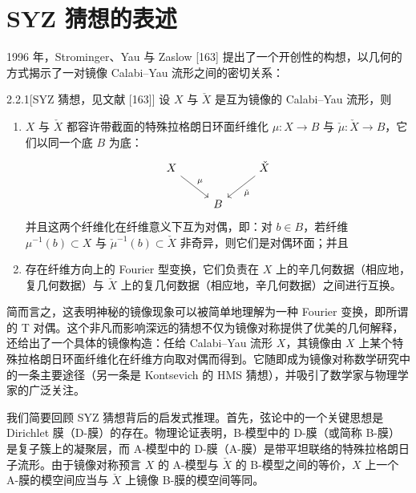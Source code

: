 \section{SYZ 猜想的表述}
1996 年，Strominger、Yau 与 Zaslow [163] 提出了一个开创性的构想，以几何的方式揭示了一对镜像 Calabi--Yau 流形之间的密切关系：

\begin{conjecture}{2.2.1}[SYZ 猜想，见文献 {[163]}]
设 $X$ 与 $\check X$ 是互为镜像的 Calabi--Yau 流形，则
\begin{enumerate}
\item[(i)] $X$ 与 $\check X$ 都容许带截面的特殊拉格朗日环面纤维化 $\mu:X\to B$ 与 $\check\mu:\check X\to B$，它们以同一个底 $B$ 为底：
\[
\begin{tikzcd}
X \arrow[dr, "\mu"] & & \check X \arrow[dl, "\check\mu"] \\
& B &
\end{tikzcd}
\]
并且这两个纤维化在纤维意义下互为对偶，即：对 $b\in B$，若纤维 $\mu^{-1}(b)\subset X$ 与 $\check\mu^{-1}(b)\subset\check X$ 非奇异，则它们是对偶环面；并且
\item[(ii)] 存在纤维方向上的 Fourier 型变换，它们负责在 $X$ 上的辛几何数据（相应地，复几何数据）与 $\check X$ 上的复几何数据（相应地，辛几何数据）之间进行互换。
\end{enumerate}
\end{conjecture}

简而言之，这表明神秘的镜像现象可以被简单地理解为一种 Fourier 变换，即所谓的 T 对偶。这个非凡而影响深远的猜想不仅为镜像对称提供了优美的几何解释，还给出了一个具体的镜像构造：任给 Calabi--Yau 流形 $X$，其镜像由 $X$ 上某个特殊拉格朗日环面纤维化在纤维方向取对偶而得到。它随即成为镜像对称数学研究中的一条主要途径（另一条是 Kontsevich 的 HMS 猜想），并吸引了数学家与物理学家的广泛关注。

我们简要回顾 SYZ 猜想背后的启发式推理。首先，弦论中的一个关键思想是 Dirichlet 膜（D-膜）的存在。物理论证表明，B-模型中的 D-膜（或简称 B-膜）是复子簇上的凝聚层，而 A-模型中的 D-膜（A-膜）是带平坦联络的特殊拉格朗日子流形。由于镜像对称预言 $X$ 的 A-模型与 $\check X$ 的 B-模型之间的等价，$X$ 上一个 A-膜的模空间应当与 $\check X$ 上镜像 B-膜的模空间等同。

